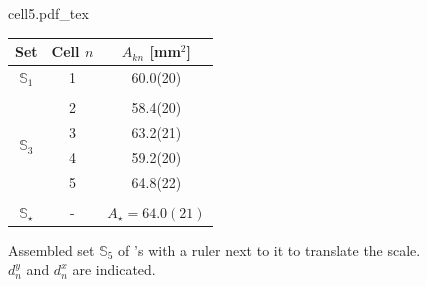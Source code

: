 \begin{figure}[t]\centering
\begin{minipage}{0.48\textwidth}\centering
\def\svgwidth{0.9\textwidth}
\caption{Assembled set $\mathbb{S}_5$ of \BHSC’s with a ruler next to it to translate the scale. $d_n^y$ and $d_n^x$ are indicated.}
\label{fig:realblob}
{cell5.pdf_tex}
\end{minipage}
\hspace{4mm}
\begin{minipage}{0.48\textwidth}\centering
\vspace*{-1.5\baselineskip}
\begin{tabular}{@{}ccc@{}}\toprule
Set                             & Cell $n$ & $A_{kn}$ {[}mm$^2${]}     \\ \midrule
$\mathbb{S}_1$                  & 1        & 60.0(20)                  \\
&          &                           \\
\multirow{4}{*}{$\mathbb{S}_3$} & 2        & 58.4(20)                  \\
& 3        & 63.2(21)                  \\
& 4        & 59.2(20)                  \\
& 5        & 64.8(22)                  \\
&          &                           \\
$\mathbb{S}_\star$              & -        & $A_\star = 64.0(21)$ \\ \bottomrule
\end{tabular}
\end{minipage}
\end{figure}

